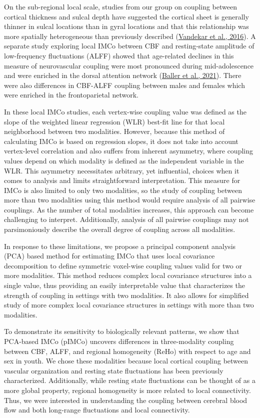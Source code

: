 \documentclass[
  12pt,
]{article}
\begin{document}
On the sub-regional local scale, studies from our group on coupling between cortical thickness and sulcal depth have suggested the cortical sheet is generally thinner in sulcal locations than in gyral locations and that this relationship was more spatially heterogeneous than previously described (\protect\hyperlink{ref-vandekarSubjectlevelMeasurementLocal2016}{Vandekar et al., 2016}). A separate study exploring local IMCo between CBF and resting-state amplitude of low-frequency fluctuations (ALFF) showed that age-related declines in this measure of neurovascular coupling were most pronounced during mid-adolescence and were enriched in the dorsal attention network (\protect\hyperlink{ref-ballerDevelopmentalCouplingCerebral2021}{Baller et al., 2021}). There were also differences in CBF-ALFF coupling between males and females which were enriched in the frontoparietal network.

In these local IMCo studies, each vertex-wise coupling value was defined as the slope of the weighted linear regression (WLR) best-fit line for that local neighborhood between two modalities. However, because this method of calculating IMCo is based on regression slopes, it does not take into account vertex-level correlation and also suffers from inherent asymmetry, where coupling values depend on which modality is defined as the independent variable in the WLR. This asymmetry necessitates arbitrary, yet influential, choices when it comes to analysis and limits straightforward interpretation. This measure for IMCo is also limited to only two modalities, so the study of coupling between more than two modalities using this method would require analysis of all pairwise couplings. As the number of total modalities increases, this approach can become challenging to interpret. Additionally, analysis of all pairwise couplings may not parsimoniously describe the overall degree of coupling across all modalities.

In response to these limitations, we propose a principal component analysis (PCA) based method for estimating IMCo that uses local covariance decomposition to define symmetric voxel-wise coupling values valid for two or more modalities. This method reduces complex local covariance structures into a single value, thus providing an easily interpretable value that characterizes the strength of coupling in settings with two modalities. It also allows for simplified study of more complex local covariance structures in settings with more than two modalities.

To demonstrate its sensitivity to biologically relevant patterns, we show that PCA-based IMCo (pIMCo) uncovers differences in three-modality coupling between CBF, ALFF, and regional homogeneity (ReHo) with respect to age and sex in youth. We chose these modalities because local cortical coupling between vascular organization and resting state fluctuations has been previously characterized. Additionally, while resting state fluctuations can be thought of as a more global property, regional homogeneity is more related to local connectivity. Thus, we were interested in understanding the coupling between cerebral blood flow and both long-range fluctuations and local connectivity.
\end{document}
